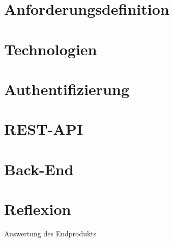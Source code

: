 







\chapter{Anforderungsdefinition}	


\chapter{Technologien}


\chapter{Authentifizierung}


\chapter{REST-API}


\chapter{Back-End}\label{backend}


\chapter{Reflexion}
Auswertung des Endprodukts

%

